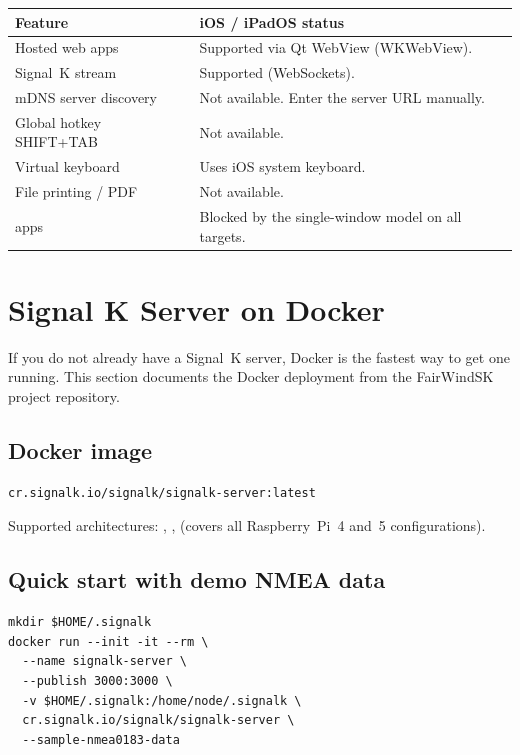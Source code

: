 \begin{longtable}{L{5.2cm}L{8.5cm}}
\toprule
{}
\color{white}\sffamily\bfseries Feature &
\color{white}\sffamily\bfseries iOS / iPadOS status \\
\midrule
Hosted web apps          & Supported via Qt WebView (WKWebView). \\
Signal~K stream          & Supported (WebSockets). \\
mDNS server discovery    & Not available. Enter the server URL manually. \\
Global hotkey SHIFT+TAB  & Not available. \\
Virtual keyboard         & Uses iOS system keyboard. \\
File printing / PDF      & Not available. \\
 apps      & Blocked by the single-window model on all targets. \\
\bottomrule
\end{longtable}

\section{Signal K Server on Docker}
\label{app:signalk-docker}

If you do not already have a Signal~K server, Docker is the fastest
way to get one running.
This section documents the Docker deployment from the
FairWindSK project repository.

\subsection{Docker image}

\begin{lstlisting}
cr.signalk.io/signalk/signalk-server:latest
\end{lstlisting}

Supported architectures: , ,
 (covers all Raspberry~Pi~4 and~5 configurations).

\subsection{Quick start with demo NMEA data}

\begin{lstlisting}
mkdir $HOME/.signalk
docker run --init -it --rm \
  --name signalk-server \
  --publish 3000:3000 \
  -v $HOME/.signalk:/home/node/.signalk \
  cr.signalk.io/signalk/signalk-server \
  --sample-nmea0183-data
\end{lstlisting}

